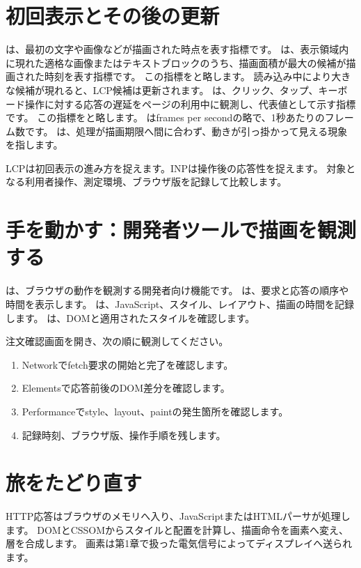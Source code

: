 \section{初回表示とその後の更新}

は、最初の文字や画像などが描画された時点を表す指標です。
は、表示領域内に現れた適格な画像またはテキストブロックのうち、描画面積が最大の候補が描画された時刻を表す指標です。
この指標をと略します。
読み込み中により大きな候補が現れると、LCP候補は更新されます。
は、クリック、タップ、キーボード操作に対する応答の遅延をページの利用中に観測し、代表値として示す指標です。
この指標をと略します。
はframes per secondの略で、1秒あたりのフレーム数です。
は、処理が描画期限へ間に合わず、動きが引っ掛かって見える現象を指します。

LCPは初回表示の進み方を捉えます。INPは操作後の応答性を捉えます。
対象となる利用者操作、測定環境、ブラウザ版を記録して比較します。

\section{手を動かす：開発者ツールで描画を観測する}

は、ブラウザの動作を観測する開発者向け機能です。
は、要求と応答の順序や時間を表示します。
は、JavaScript、スタイル、レイアウト、描画の時間を記録します。
は、DOMと適用されたスタイルを確認します。

注文確認画面を開き、次の順に観測してください。

\begin{enumerate}
  \item Networkでfetch要求の開始と完了を確認します。
  \item Elementsで応答前後のDOM差分を確認します。
  \item Performanceでstyle、layout、paintの発生箇所を確認します。
  \item 記録時刻、ブラウザ版、操作手順を残します。
\end{enumerate}

\section{旅をたどり直す}

HTTP応答はブラウザのメモリへ入り、JavaScriptまたはHTMLパーサが処理します。
DOMとCSSOMからスタイルと配置を計算し、描画命令を画素へ変え、層を合成します。
画素は第1章で扱った電気信号によってディスプレイへ送られます。


